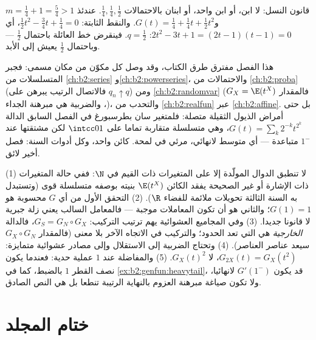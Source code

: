 \begin{example}\label{ex:b2:genfun:branchingexample}
قانون النسل: لا ابن، أو ابن واحد، أو ابنان بالاحتمالات $\frac14, \frac14, \frac12$.
عندئذ $m = \frac14 + 1 =
\frac54 > 1$ و$G(t) = \frac14 + \frac14 t + \frac12 t^2$. والنقط الثابتة: $\frac12 t^2 - \frac34 t + \frac14 = 0$، أي $2t^2 - 3t
+ 1 = (2t - 1)(t - 1) = 0$: $q = \frac12$.
فينقرض خط العائلة باحتمال $\frac12$ --- وباحتمال $\frac12$ يعيش إلى الأبد.
\end{example}

\begin{remark}
هذا الفصل مفترق طرق الكتاب، وقد وصل كل مكوّن من مكان مسمى: فجبر
المتسلسلات من \cref{ch:b2:series} و\cref{ch:b2:powerseries}، والاحتمالات من \cref{ch:b2:proba} (فالاتصال
الرتيب يبرهن على $q_n \uparrow q$) ومن \cref{ch:b2:randomvar} (فالمقدار $G_X =
\E(t^X)$ ،
والضربية هي مبرهنة الجداء)، والتحدب من \cref{ch:b2:realfun} عبر \cref{ch:b2:affine}. بل حتى
أمراض الذيول الثقيلة متصلة: فلمتغير سان بطرسبورغ في الفصل السابق
الدالة $G(t) = \sum_k2^{-k}t^{2^k}$، وهي متسلسلة متقاربة تماما على $\intcc01$ لكن مشتقتها
عند $1^-$ متباعدة --- أي متوسط لانهائي، مرئي في لمحة. كائن واحد،
وكل أدوات السنة: فصل أخير لائق.
\end{remark}

\begin{remark}
(1) لا تنطبق الدوال المولّدة إلا على المتغيرات ذات القيم في $\N$:
ففي حالة المتغيرات ذات الإشارة أو غير الصحيحة يفقد الكائن $\E(t^X)$
بنيته بوصفه متسلسلة قوى (وتستبدل به السنة الثالثة تحويلات ملائمة
للفضاء $\R$). (2) التحقق الأول من أي $G$ محسوبة هو $G(1) = 1$؛
والثاني هو أن تكون المعاملات موجبة --- فالمعامل السالب يعني زلة جبرية
لا قانونا جديدا. (3) وفي المجاميع العشوائية يهم ترتيب التركيب:
$G_S = G_N \circ G_X$، فالدالة \emph{الخارجية} هي التي تعد الحدود؛ والتركيب في
الاتجاه الآخر بلا معنى (فالمقدار $G_X \circ G_N$ سيعد عناصر العناصر). (4)
وتحتاج الضربية إلى الاستقلال وإلى مصادر عشوائية متمايزة: $G_{2X}(t) = G_X(t^2)$، لا
$G_X(t)^2$. (5) والمفاضلة عند $1$ عملية حدية: فعندما يكون نصف القطر
$1$ بالضبط، كما في \cref{ex:b2:genfun:heavytail}، قد يكون $G'(1^-)$ لانهائيا، ولا تكون
صياغة مبرهنة العزوم بالنهاية الرتيبة تنطعا بل هي النص الصادق.
\end{remark}

\section*{ختام المجلد}

